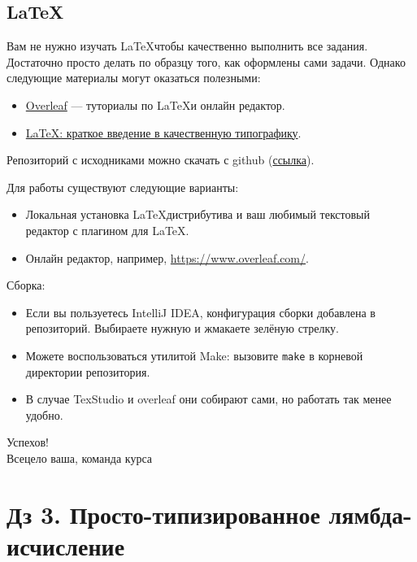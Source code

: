 \documentclass{article}
\begin{document}
    \subsection*{\LaTeX}

    Вам не нужно изучать \LaTeX чтобы качественно выполнить все задания.
    Достаточно просто делать по образцу того, как оформлены сами задачи.
    Однако следующие материалы могут оказаться полезными:

    \begin{itemize}
        \item \href{https://www.overleaf.com/learn}{Overleaf} --- туториалы по \LaTeX и онлайн редактор.
        \item \href{https://youtu.be/NOslSvJs29I}{LaTeX: краткое введение в качественную типографику}.
    \end{itemize}

    Репозиторий с исходниками можно скачать с github (\href{https://github.com/fpcourse-materials/lambda-hws}{ссылка}).

    Для работы существуют следующие варианты:
    \begin{itemize}
        \item Локальная установка \LaTeX дистрибутива и ваш любимый текстовый редактор с плагином для \LaTeX.
        \item Онлайн редактор, например, \url{https://www.overleaf.com/}.
    \end{itemize}

    Сборка:
    \begin{itemize}
        \item Если вы пользуетесь IntelliJ IDEA, конфигурация сборки добавлена в репозиторий.
        Выбираете нужную и жмакаете зелёную стрелку.
        \item Можете воспользоваться утилитой Make: вызовите \texttt{make} в корневой директории репозитория.
        \item В случае TexStudio и overleaf они собирают сами, но работать так менее удобно.
    \end{itemize}

    \begin{flushright}
        Успехов! \\
        Всецело ваша, команда курса
    \end{flushright}

    \newpage


    \section*{Дз 3. Просто-типизированное лямбда-исчисление}
\end{document}
